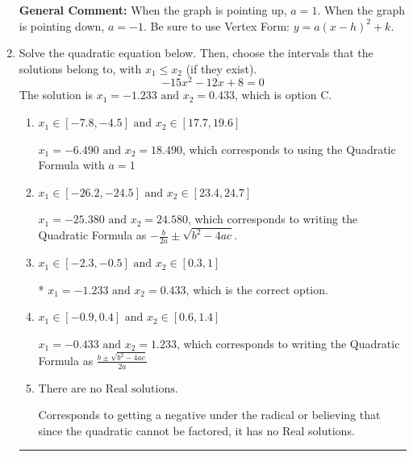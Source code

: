 \documentclass{extbook}[14pt]
\newcommand{\litem}[1]{\item #1

\rule{\textwidth}{0.4pt}}
\begin{document}
\begin{enumerate}
{\textbf{General Comment:} When the graph is pointing up, $a=1$. When the graph is pointing down, $a=-1$. Be sure to use Vertex Form: $y = a(x-h)^2+k$.
}
\litem{
Solve the quadratic equation below. Then, choose the intervals that the solutions belong to, with $x_1 \leq x_2$ (if they exist).
\[ -15x^{2} -12 x + 8 = 0 \]The solution is \( x_1 = -1.233 \text{ and } x_2 = 0.433 \), which is option C.\begin{enumerate}[label=\Alph*.]
\item \( x_1 \in [-7.8, -4.5] \text{ and } x_2 \in [17.7, 19.6] \)

 $x_1 = -6.490 \text{ and } x_2 = 18.490$, which corresponds to using the Quadratic Formula with $a=1$
\item \( x_1 \in [-26.2, -24.5] \text{ and } x_2 \in [23.4, 24.7] \)

 $x_1 = -25.380 \text{ and } x_2 = 24.580$, which corresponds to writing the Quadratic Formula as $-\frac{b}{2a} \pm \sqrt{b^2 - 4ac}$.
\item \( x_1 \in [-2.3, -0.5] \text{ and } x_2 \in [0.3, 1] \)

* $x_1 = -1.233 \text{ and } x_2 = 0.433$, which is the correct option.
\item \( x_1 \in [-0.9, 0.4] \text{ and } x_2 \in [0.6, 1.4] \)

 $x_1 = -0.433 \text{ and } x_2 = 1.233$, which corresponds to writing the Quadratic Formula as $\frac{b \pm \sqrt{b^2 - 4ac}}{2a}$
\item \( \text{There are no Real solutions.} \)

Corresponds to getting a negative under the radical or believing that since the quadratic cannot be factored, it has no Real solutions.
\end{enumerate}

}
\end{enumerate}
\end{document}
